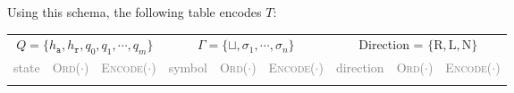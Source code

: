 Using this schema, the following table encodes $T$:

\begin{table}[h]
    \centering
    \renewcommand{\arraystretch}{1.3}  %
    \begin{tabular}{|ccc|ccc|ccc|}
        \hline
        \multicolumn{3}{|c|}{$Q = \{h_{\mathtt{a}}, h_{\mathtt{r}}, q_0, q_1, \cdots , q_m\}$} & 
        \multicolumn{3}{c|}{$\Gamma = \{\sqcup, \sigma_1, \cdots , \sigma_n\}$} & 
        \multicolumn{3}{c|}{Direction = $\{\mathrm{R}, \mathrm{L}, \mathrm{N}\}$} \\
        \multicolumn{1}{|c}{\textcolor{gray}{state}} & 
        \multicolumn{1}{c}{\textcolor{gray}{\textsc{Ord}($\cdot$)}} & 
        \multicolumn{1}{c|}{\textcolor{gray}{\textsc{Encode}($\cdot$)}} & 
        \multicolumn{1}{c}{\textcolor{gray}{symbol}} & 
        \multicolumn{1}{c}{\textcolor{gray}{\textsc{Ord}($\cdot$)}} & 
        \multicolumn{1}{c|}{\textcolor{gray}{\textsc{Encode}($\cdot$)}} & 
        \multicolumn{1}{c}{\textcolor{gray}{direction}} & 
        \multicolumn{1}{c}{\textcolor{gray}{\textsc{Ord}($\cdot$)}} & 
        \multicolumn{1}{c|}{\textcolor{gray}{\textsc{Encode}($\cdot$)}} \\
        \hline
        \hline
        {%
            {%
            {%
            {%
        {%
        \hline
    \end{tabular}
\end{table}

